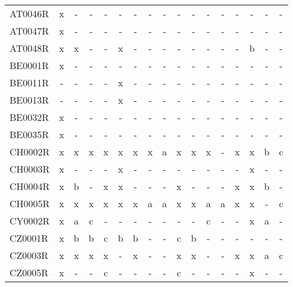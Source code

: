 \begin{table}
{{\begin{tabular}{l|cccccccccccccccc}
        AT0046R &  x &   - &    - &      - &   - &    - &    - &    - &      - &    - &    - &   - &      - &    - &    - &     - \\
        AT0047R &  x &   - &    - &      - &   - &    - &    - &    - &      - &    - &    - &   - &      - &    - &    - &     - \\
        AT0048R &  x &   x &    - &      - &   x &    - &    - &    - &      - &    - &    - &   - &      - &    b &    - &     - \\
        BE0001R &  x &   - &    - &      - &   - &    - &    - &    - &      - &    - &    - &   - &      - &    - &    - &     - \\
        BE0011R &  - &   - &    - &      - &   x &    - &    - &    - &      - &    - &    - &   - &      - &    - &    - &     - \\
        BE0013R &  - &   - &    - &      - &   x &    - &    - &    - &      - &    - &    - &   - &      - &    - &    - &     - \\
        BE0032R &  x &   - &    - &      - &   - &    - &    - &    - &      - &    - &    - &   - &      - &    - &    - &     - \\
        BE0035R &  x &   - &    - &      - &   - &    - &    - &    - &      - &    - &    - &   - &      - &    - &    - &     - \\
        CH0002R &  x &   x &    x &      x &   x &    x &    x &    a &      x &    x &    x &   - &      x &    x &    b &     c \\
        CH0003R &  x &   - &    - &      - &   x &    - &    - &    - &      - &    - &    - &   - &      - &    x &    - &     - \\
        CH0004R &  x &   b &    - &      x &   x &    - &    - &    - &      x &    - &    - &   - &      x &    x &    b &     - \\
        CH0005R &  x &   x &    x &      x &   x &    x &    a &    a &      x &    x &    a &   a &      x &    x &    - &     c \\
        CY0002R &  x &   a &    c &      - &   - &    - &    - &    - &      - &    - &    c &   - &      - &    x &    a &     - \\
        CZ0001R &  x &   b &    b &      c &   b &    b &    - &    - &      c &    b &    - &   - &      - &    - &    - &     - \\
        CZ0003R &  x &   x &    x &      x &   - &    x &    - &    - &      x &    x &    - &   - &      x &    x &    a &     c \\
        CZ0005R &  x &   - &    - &      c &   - &    - &    - &    - &      c &    - &    - &   - &      - &    x &    - &     - \\

\end{tabular}}}
\end{table}
